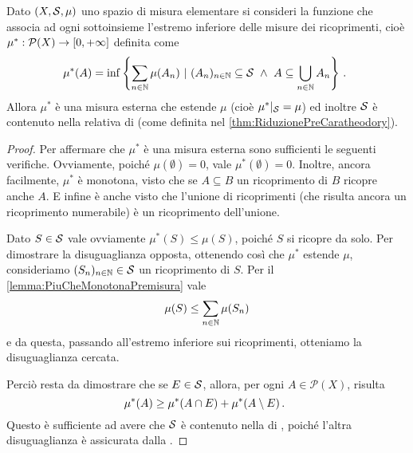 \begin{proposition}\label{prop:MisuraEsternaDiPremisura}
	Dato $(X,\S,\mu)$ uno spazio di misura elementare si consideri la funzione che associa ad ogni sottoinsieme l'estremo inferiore delle misure dei ricoprimenti, cioè $\mu^*:\mathcal P(X)\to\Rpiu$ definita come 
	\begin{equation*}
		\mu^*(A)=\inf\left\{\sum_{n\in\N} \mu(A_n)\ |\ (A_n)_{n\in\N}\subseteq\S\ \wedge
		\ A\subseteq\bigcup_{n\in\N}A_n\right\} \punto
	\end{equation*}
	Allora $\mu^*$ è una misura esterna che estende $\mu$ (cioè $\mu^*|_\S=\mu$) ed inoltre $\S$ è contenuto nella relativa \sigalg{} di \carat{} (come definita nel \cref{thm:RiduzionePreCaratheodory}).
\end{proposition}
\begin{proof}
	Per affermare che $\mu^*$ è una misura esterna sono sufficienti le seguenti verifiche.
	Ovviamente, poiché $\mu(\emptyset)=0$, vale $\mu^*(\emptyset)=0$. 
	Inoltre, ancora facilmente, $\mu^*$ è monotona, visto che se $A\subseteq B$ un ricoprimento di $B$ ricopre anche $A$.
	E infine è anche \sigsubadd{} visto che l'unione di ricoprimenti (che risulta ancora un ricoprimento numerabile) è un ricoprimento dell'unione.
	
	Dato $S\in\S$ vale ovviamente $\mu^*(S)\le\mu(S)$, poiché $S$ si ricopre da solo. Per dimostrare la disuguaglianza opposta, ottenendo così che $\mu^*$ estende $\mu$, consideriamo $(S_n)_{n\in\N}\in \S$ un ricoprimento di $S$. Per il \cref{lemma:PiuCheMonotonaPremisura} vale
	\begin{equation*}
		\mu(S)\le \sum_{n\in\N} \mu(S_n)
	\end{equation*}
	e da questa, passando all'estremo inferiore sui ricoprimenti, otteniamo la disuguaglianza cercata.
	
	Perciò resta da dimostrare che se $E\in \S$, allora, per ogni $A\in\mathcal P(X)$, risulta
	\begin{equation}\label{eq:MisuraEsternaDisDifficile}
		\mu^*(A) \ge \mu^*(A\cap E)+\mu^*(A\setminus E) \punto
	\end{equation}
	Questo è sufficiente ad avere che $\S$ è contenuto nella \sigalg{} di \carat{}, poiché l'altra disuguaglianza è assicurata dalla \sigsubadd[ità].
	

\end{proof}
